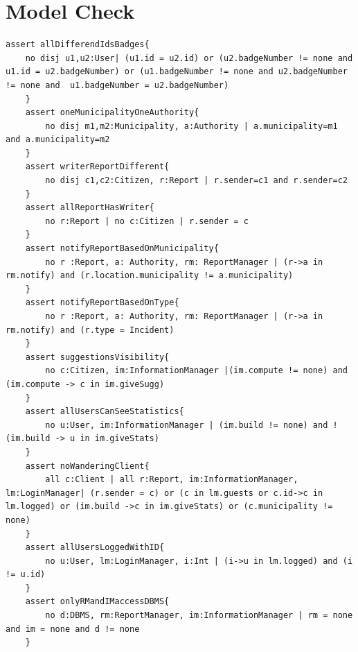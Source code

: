 \documentclass{report}
\begin{document}
\section{Model Check}
\begin{lstlisting}[language=alloy]
	assert allDifferendIdsBadges{
	no disj u1,u2:User| (u1.id = u2.id) or (u2.badgeNumber != none and u1.id = u2.badgeNumber) or (u1.badgeNumber != none and u2.badgeNumber != none and  u1.badgeNumber = u2.badgeNumber)
	}
	assert oneMunicipalityOneAuthority{
		no disj m1,m2:Municipality, a:Authority | a.municipality=m1 and a.municipality=m2
	}
	assert writerReportDifferent{
		no disj c1,c2:Citizen, r:Report | r.sender=c1 and r.sender=c2
	}
	assert allReportHasWriter{
		no r:Report | no c:Citizen | r.sender = c
	}
	assert notifyReportBasedOnMunicipality{
		no r :Report, a: Authority, rm: ReportManager | (r->a in rm.notify) and (r.location.municipality != a.municipality) 
	}
	assert notifyReportBasedOnType{
		no r :Report, a: Authority, rm: ReportManager | (r->a in rm.notify) and (r.type = Incident) 
	}
	assert suggestionsVisibility{
		no c:Citizen, im:InformationManager |(im.compute != none) and (im.compute -> c in im.giveSugg)
	}
	assert allUsersCanSeeStatistics{
		no u:User, im:InformationManager | (im.build != none) and !(im.build -> u in im.giveStats)
	}
	assert noWanderingClient{
		all c:Client | all r:Report, im:InformationManager, lm:LoginManager| (r.sender = c) or (c in lm.guests or c.id->c in lm.logged) or (im.build ->c in im.giveStats) or (c.municipality != none)
	} 
	assert allUsersLoggedWithID{
		no u:User, lm:LoginManager, i:Int | (i->u in lm.logged) and (i != u.id)
	}
	assert onlyRMandIMaccessDBMS{
		no d:DBMS, rm:ReportManager, im:InformationManager | rm = none and im = none and d != none
	}
\end{lstlisting}
\end{document}
